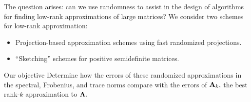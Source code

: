 \documentclass[xcolor=x11names,compress,ignorenonframetext]{beamer}
\renewcommand{\(}{\begin{columns}}
\renewcommand{\)}{\end{columns}}
\newcommand{\<}[1]{\begin{column}{#1}}
\renewcommand{\>}{\end{column}}
\begin{document}
\begin{frame}
 The question arises: can we use randomness to assist in the design of algorithms
 for finding low-rank approximations of large matrices? We consider two
 schemes for low-rank approximation:
 \begin{itemize}
  \item Projection-based approximation schemes using fast randomized projections.
  \item ``Sketching'' schemes for positive semidefinite matrices.
 \end{itemize}
 
\begin{block}{Our objective}
 Determine how the errors of these
 randomized approximations in the spectral, Frobenius, and trace norms compare with the errors of $\mathbf{A}_k,$ the 
 best rank-$k$ approximation to $\mathbf{A}.$
\end{block}

%  
%  
\end{frame}

% 
% 
\end{document}
